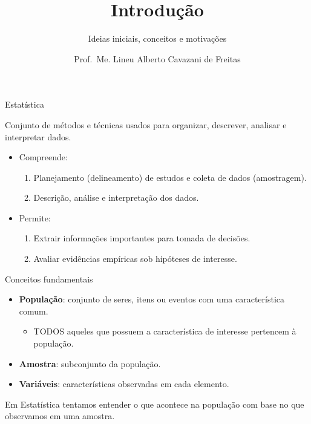 \documentclass[
  ignorenonframetext,
  serif,
  professionalfont,
  usenames,
  dvipsnames,
  aspectratio = 169]{beamer}
\title{\textbf{Introdução}}
\subtitle{Ideias iniciais, conceitos e motivações}
\author{Prof.~Me. Lineu Alberto Cavazani de Freitas}
\date{}
\institute{\textbf{CE003 – Estatística II}\\
\strut \\
Departamento de Estatística\\
Laboratório de Estatística e Geoinformação}
\providecommand{\tightlist}{%
  \setlength{\itemsep}{0pt}\setlength{\parskip}{0pt}}
\renewcommand{\tightlist}{%
  \setlength{\itemsep}{0\baselineskip}
  \setlength{\parskip}{0.25\baselineskip}
}
\begin{document}
\frame{\titlepage}

\begin{frame}{Estatística}
\protect\hypertarget{estatuxedstica}{}
\begin{block}{}
\protect\hypertarget{section}{}
Conjunto de métodos e técnicas usados para organizar, descrever,
analisar e interpretar dados.
\end{block}

\begin{itemize}
\tightlist
\item
  Compreende:

  \begin{enumerate}
  \tightlist
  \item
    Planejamento (delineamento) de estudos e coleta de dados
    (amostragem).
  \item
    Descrição, análise e interpretação dos dados.
  \end{enumerate}
\item
  Permite:

  \begin{enumerate}
  \tightlist
  \item
    Extrair informações importantes para tomada de decisões.
  \item
    Avaliar evidências empíricas sob hipóteses de interesse.
  \end{enumerate}
\end{itemize}
\end{frame}

\begin{frame}{Conceitos fundamentais}
\protect\hypertarget{conceitos-fundamentais}{}
\begin{itemize}
\tightlist
\item
  \textbf{População}: conjunto de seres, itens ou eventos com uma
  característica comum.

  \begin{itemize}
  \tightlist
  \item
    TODOS aqueles que possuem a característica de interesse pertencem à
    população.
  \end{itemize}
\item
  \textbf{Amostra}: subconjunto da população.
\item
  \textbf{Variáveis}: características observadas em cada elemento.
\end{itemize}

Em Estatística tentamos entender o que acontece na população com base no
que observamos em uma amostra.
\end{frame}
\end{document}
